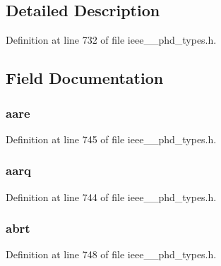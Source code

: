 \subsection{Detailed Description}


Definition at line 732 of file ieee\+\_\+\_\+phd\+\_\+types.\+h.



\subsection{Field Documentation}
\hypertarget{struct___a_p_d_u_a1b3f7cec711c5079fa06768feb76f7b9}{}
\subsubsection[{aare}]{ aare}\label{struct___a_p_d_u_a1b3f7cec711c5079fa06768feb76f7b9}


Definition at line 745 of file ieee\+\_\+\_\+phd\+\_\+types.\+h.

\hypertarget{struct___a_p_d_u_a486b1d63267a769c42661314733b0b2b}{}
\subsubsection[{aarq}]{ aarq}\label{struct___a_p_d_u_a486b1d63267a769c42661314733b0b2b}


Definition at line 744 of file ieee\+\_\+\_\+phd\+\_\+types.\+h.

\hypertarget{struct___a_p_d_u_ae3456b433d22314f8800b911b8d630b9}{}
\subsubsection[{abrt}]{ abrt}\label{struct___a_p_d_u_ae3456b433d22314f8800b911b8d630b9}


Definition at line 748 of file ieee\+\_\+\_\+phd\+\_\+types.\+h.

\hypertarget{struct___a_p_d_u_a034761fd73babd925f56cbb254ce4fb2}{}

